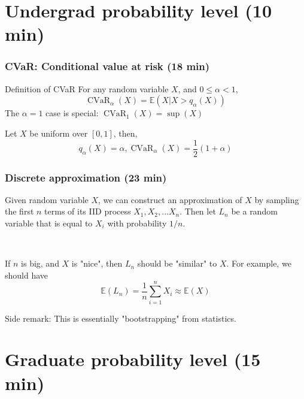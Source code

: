 \documentclass{beamer}
\newcommand{\E}{\ensuremath{\mathbb{E}}}
\newcommand{\cvar}{\ensuremath{\operatorname{CVaR}}}
\begin{document}
\section{Undergrad probability level (10 min)}

\begin{frame}
	\frametitle{CVaR: Conditional value at risk (18 min)}
	
	\begin{block}{Definition of CVaR}
		For any random variable $X$, and $0\le\alpha<1$, 
		$$
		\cvar_\alpha(X) = \E(X|X > q_\alpha(X))
		$$
		The $\alpha = 1$ case is special:
		$\cvar_1(X) = \sup(X)$
	\end{block}\pause

	\begin{example}
		Let $X$ be uniform over $[0, 1]$, then,
		$$q_\alpha(X) = \alpha, \cvar_\alpha(X) = \frac 12 (1+\alpha)$$
	\end{example}
\end{frame}

\begin{frame}
\frametitle{Discrete approximation (23 min)}
	Given random variable $X$, we can construct an approximation of $X$ by sampling the first $n$ terms of its IID process $X_1, X_2, ... X_n$. Then let $L_n$ be a random variable that is equal to $X_i$ with probability $1/n$. \pause
	
	~
	
	If $n$ is big, and $X$ is "nice", then $L_n$ should be "similar" to $X$. For example, we should have 
	$$\E(L_n) = \frac 1 n \sum_{i=1}^n X_i \approx \E(X)$$
	
	{\scriptsize Side remark: This is essentially "bootstrapping" from statistics.}
	
\end{frame}

\section{Graduate probability level (15 min)}
\end{document}
